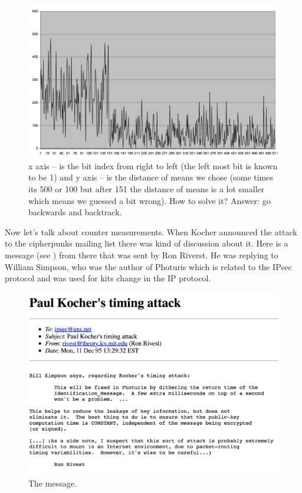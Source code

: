 \begin{figure}[!ht]
    \centering
    \includegraphics[scale=0.25]{images/figpita.png}
    \caption{x axis – is the bit index from right to left (the left most bit is known to be 1) and y axis – is the distance of means we chose (some times its 500 or 100 but after 151 the distance of means is a lot smaller which means we guessed a bit wrong). How to solve it? Answer: go backwards and backtrack.} \label{fig:figpita}
\end{figure}

Now let's talk about counter measurements. When Kocher announced the attack to
the cipherpunks mailing list there was kind of discussion about it. Here is a
message (see ) from there that was sent by Ron Riverst. He was
replying to William Simpson, who was the author of Photuris which is related to
the IPsec protocol and was used for kits change in the IP protocol. 

\begin{figure}[!ht]
    \centering
    \includegraphics[scale=0.25]{images/paul.png}
    \caption{The message.} \label{fig:paul}
\end{figure}

